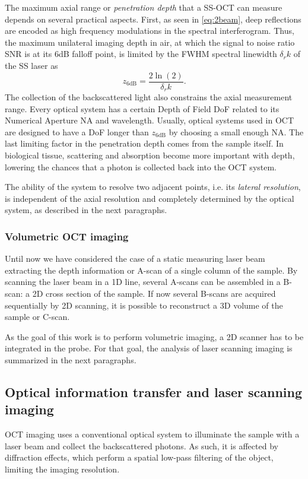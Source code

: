 The maximum axial range or \textit{penetration depth} that a SS-OCT can measure depends on several practical aspects. First, as seen in \autoref{eq:2beam}, deep reflections are encoded as high frequency modulations in the spectral interferogram. Thus, the maximum unilateral imaging depth in air, at which the signal to noise ratio SNR is at its 6dB falloff point, is limited by the FWHM spectral linewidth $\delta_r k$ of the SS laser \cite{Drexler2008} as
\begin{equation}
z_\textrm{6dB} = \frac{2 \ln{(2)}}{\delta_r k}.
\end{equation}
The collection of the backscattered light also constrains the axial measurement range. Every optical system has a certain Depth of Field DoF related to its Numerical Aperture NA and wavelength. Usually, optical systems used in OCT are designed to have a DoF longer than $z_\textrm{6dB}$ by choosing a small enough NA.
The last limiting factor in the penetration depth comes from the sample itself. In biological tissue, scattering and absorption become more important with depth, lowering the chances that a photon is collected back into the OCT system.

The ability of the system to resolve two adjacent points, i.e. its \textit{lateral resolution}, is independent of the axial resolution and completely determined by the optical system, as described in the next paragraphs. 

\subsubsection{Volumetric OCT imaging}
Until now we have considered the case of a static measuring laser beam extracting the depth information or A-scan of a single column of the sample. By scanning the laser beam in a 1D line, several A-scans can be assembled in a B-scan: a 2D cross section of the sample. If now several B-scans are acquired sequentially by 2D scanning, it is possible to reconstruct a 3D volume of the sample or C-scan.

As the goal of this work is to perform volumetric imaging, a 2D scanner has to be integrated in the probe. For that goal, the analysis of laser scanning imaging is summarized in the next paragraphs.


\subsection{Optical information transfer and laser scanning imaging}
\label{ssec:rayleigh}
OCT imaging uses a conventional optical system to illuminate the sample with a laser beam and collect the backscattered photons. As such, it is affected by diffraction effects, which perform a spatial low-pass filtering of the object, limiting the imaging resolution. 

